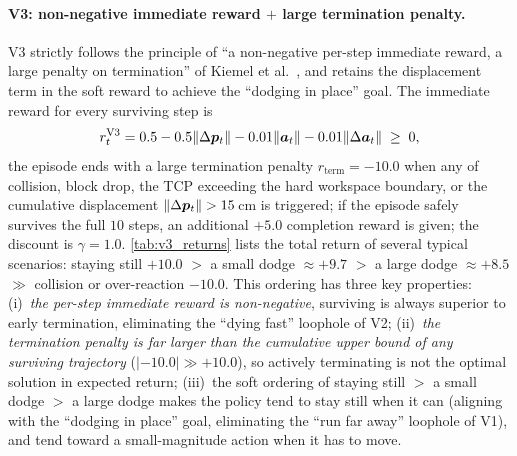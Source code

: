 \paragraph{V3: non-negative immediate reward $+$ large termination penalty.} V3 strictly follows the principle of ``a non-negative per-step immediate reward, a large penalty on termination'' of Kiemel et al.~\cite{kiemel2024safe}, and retains the displacement term in the soft reward to achieve the ``dodging in place'' goal. The immediate reward for every surviving step is
\begin{equation*}
  r_t^{\text{V3}} = 0.5 - 0.5 \lVert\Delta\bm{p}_t\rVert - 0.01 \lVert\bm{a}_t\rVert - 0.01 \lVert\Delta\bm{a}_t\rVert \;\geq\; 0,
\end{equation*}
the episode ends with a large termination penalty $r_{\text{term}} = -10.0$ when any of collision, block drop, the TCP exceeding the hard workspace boundary, or the cumulative displacement $\lVert\Delta\bm{p}_t\rVert > 15$\,cm is triggered; if the episode safely survives the full $10$ steps, an additional $+5.0$ completion reward is given; the discount is $\gamma = 1.0$. \cref{tab:v3_returns} lists the total return of several typical scenarios: staying still $+10.0$ $>$ a small dodge $\approx +9.7$ $>$ a large dodge $\approx +8.5$ $\gg$ collision or over-reaction $-10.0$. This ordering has three key properties: (i)~\emph{the per-step immediate reward is non-negative}, surviving is always superior to early termination, eliminating the ``dying fast'' loophole of V2; (ii)~\emph{the termination penalty is far larger than the cumulative upper bound of any surviving trajectory} ($|{-10.0}| \gg +10.0$), so actively terminating is not the optimal solution in expected return; (iii)~the soft ordering of staying still $>$ a small dodge $>$ a large dodge makes the policy tend to stay still when it can (aligning with the ``dodging in place'' goal, eliminating the ``run far away'' loophole of V1), and tend toward a small-magnitude action when it has to move.

